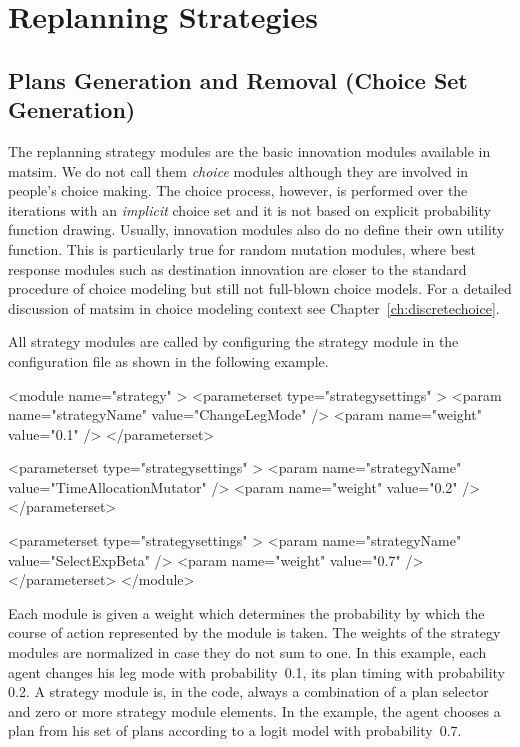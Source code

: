 
\section{Replanning Strategies}
\label{sec:strategymodules}

\subsection{Plans Generation and Removal (Choice Set Generation)}

The replanning strategy modules are the basic innovation modules available in \gls{matsim}. We do not call them \emph{choice} modules although they are involved in people's choice making. The choice process, however, is performed over the iterations with an \emph{implicit} choice set and it is not based on explicit probability function drawing. Usually, innovation modules also do no define their own utility function. This is particularly true for random mutation modules, where best response modules such as destination innovation are closer to the standard procedure of choice modeling but still not full-blown choice models. For a detailed discussion of \gls{matsim} in choice modeling context see Chapter~\ref{ch:discretechoice}.

All strategy modules are called by configuring the strategy module in the configuration file as shown in the following example.
%
\begin{xml}
<module name="strategy" >
	<parameterset type="strategysettings" >
		<param name="strategyName" value="ChangeLegMode" />
		<param name="weight" value="0.1" />
	</parameterset>
	
	<parameterset type="strategysettings" >
		<param name="strategyName" value="TimeAllocationMutator" />
		<param name="weight" value="0.2" />
	</parameterset>
	
	<parameterset type="strategysettings" >
		<param name="strategyName" value="SelectExpBeta" />
		<param name="weight" value="0.7" />
	</parameterset>
</module>
\end{xml}
%
Each module is given a weight which determines the probability by which the course of action represented by the module is taken. The weights of the strategy modules are normalized in case they do not sum to one. In this example, each agent changes his leg mode with probability~0.1, its plan timing with probability 0.2. A strategy module is, in the code, always a combination of a plan selector and zero or more strategy module elements. In the example, the agent chooses a plan from his set of plans according to a logit model with probability~0.7. 

